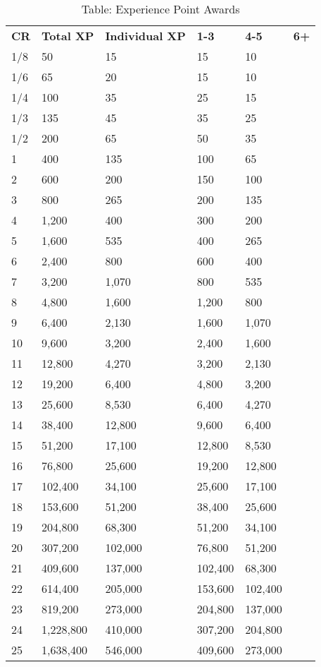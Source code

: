 \begin{table}[]
\sffamily
\caption{Table: Experience Point Awards}
\begin{tabular}{llllll}
\textbf{CR} & \textbf{Total XP} & \textbf{Individual XP} & \textbf{1-3} & \textbf{4-5} & \textbf{6+}\\
1/8 & 50 & 15 & 15 & 10 \\
 1/6 & 65 & 20 & 15 & 10 \\
 1/4 & 100 & 35 & 25 & 15 \\
 1/3 & 135 & 45 & 35 & 25 \\
 1/2 & 200 & 65 & 50 & 35 \\
 1 & 400 & 135 & 100 & 65 \\
 2 & 600 & 200 & 150 & 100 \\
 3 & 800 & 265 & 200 & 135 \\
 4 & 1,200 & 400 & 300 & 200 \\
 5 & 1,600 & 535 & 400 & 265 \\
 6 & 2,400 & 800 & 600 & 400 \\
 7 & 3,200 & 1,070 & 800 & 535 \\
 8 & 4,800 & 1,600 & 1,200 & 800 \\
 9 & 6,400 & 2,130 & 1,600 & 1,070 \\
 10 & 9,600 & 3,200 & 2,400 & 1,600 \\
 11 & 12,800 & 4,270 & 3,200 & 2,130 \\
 12 & 19,200 & 6,400 & 4,800 & 3,200 \\
 13 & 25,600 & 8,530 & 6,400 & 4,270 \\
 14 & 38,400 & 12,800 & 9,600 & 6,400 \\
 15 & 51,200 & 17,100 & 12,800 & 8,530 \\
 16 & 76,800 & 25,600 & 19,200 & 12,800 \\
 17 & 102,400 & 34,100 & 25,600 & 17,100 \\
 18 & 153,600 & 51,200 & 38,400 & 25,600 \\
 19 & 204,800 & 68,300 & 51,200 & 34,100 \\
 20 & 307,200 & 102,000 & 76,800 & 51,200 \\
 21 & 409,600 & 137,000 & 102,400 & 68,300 \\
 22 & 614,400 & 205,000 & 153,600 & 102,400 \\
 23 & 819,200 & 273,000 & 204,800 & 137,000 \\
 24 & 1,228,800 & 410,000 & 307,200 & 204,800 \\
 25 & 1,638,400 & 546,000 & 409,600 & 273,000\\
\end{tabular}
\end{table}


